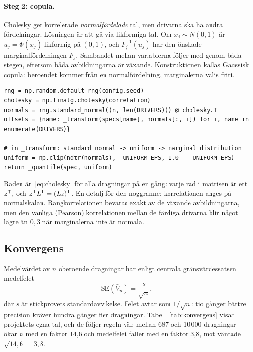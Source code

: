 \paragraph{Steg 2: copula.} Cholesky ger korrelerade \emph{normalfördelade} tal, men drivarna
ska ha andra fördelningar. Lösningen är att gå via likformiga tal. Om $x_j \sim N(0, 1)$ är
$u_j = \Phi(x_j)$ likformig på $(0, 1)$, och $F_j^{-1}(u_j)$ har den önskade
marginalfördelningen $F_j$. Sambandet mellan variablerna följer med genom båda stegen, eftersom
båda avbildningarna är växande. Konstruktionen kallas Gaussisk copula: beroendet kommer från
en normalfördelning, marginalerna väljs fritt.

\begin{lstlisting}[caption={Dragningen i \texttt{run\_monte\_carlo} och copula-steget i
\texttt{\_transform}, \texttt{models/monte\_carlo.py}.},label=lst:mc]
rng = np.random.default_rng(config.seed)
cholesky = np.linalg.cholesky(correlation)
normals = rng.standard_normal((n, len(DRIVERS))) @ cholesky.T
offsets = {name: _transform(specs[name], normals[:, i]) for i, name in enumerate(DRIVERS)}

# in _transform: standard normal -> uniform -> marginal distribution
uniform = np.clip(ndtr(normals), _UNIFORM_EPS, 1.0 - _UNIFORM_EPS)
return _quantile(spec, uniform)
\end{lstlisting}

Raden  är~\eqref{eq:cholesky} för alla dragningar på en gång: varje rad i
matrisen är ett $z^{\mathsf{T}}$, och $z^{\mathsf{T}} L^{\mathsf{T}} = (Lz)^{\mathsf{T}}$. En detalj för den noggranne: korrelationen
anges på normalskalan. Rangkorrelationen bevaras exakt av de växande avbildningarna, men den
vanliga (Pearson) korrelationen mellan de färdiga drivarna blir något lägre än $0,3$ när
marginalerna inte är normala.

\subsection{Konvergens}

Medelvärdet av $n$ oberoende dragningar har enligt centrala gränsvärdessatsen medelfelet
\begin{equation}
  \mathrm{SE}(\bar V_n) = \frac{s}{\sqrt{n}},
  \label{eq:se}
\end{equation}
där $s$ är stickprovets standardavvikelse. Felet avtar som $1/\sqrt{n}$: tio gånger bättre
precision kräver hundra gånger fler dragningar. Tabell~\ref{tab:konvergens} visar projektets
egna tal, och de följer regeln väl: mellan 687 och 10\,000 dragningar ökar $n$ med en faktor
14,6 och medelfelet faller med en faktor 3,8, mot väntade $\sqrt{14,6} = 3,8$.

